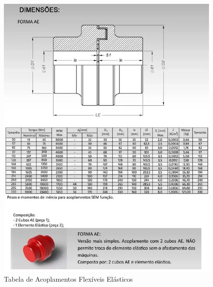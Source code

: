 \begin{anexosenv}
\begin{figure}[!ht]
	\centering
		\includegraphics[scale=0.6]{figuras/estrutura/anexos/16.png}
	\caption{Tabela de Acoplamentos Flexíveis Elásticos}
\end{figure}


\end{anexosenv}
